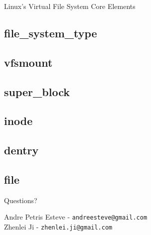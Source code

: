 \documentclass{beamer}
\begin{document}
\begin{frame}{Linux's Virtual File System Core Elements}
	

\end{frame}

\subsection{file\_system\_type}

\subsection{vfsmount}

\subsection{super\_block}

\subsection{inode}

\subsection{dentry}

\subsection{file}



\begin{frame}[plain]

  \begin{center}
    \Huge Questions?
  \end{center}

  \vspace{0.2in}

  \begin{center}
	Andre Petris Esteve - \texttt{andreesteve@gmail.com}\\
	Zhenlei Ji - \texttt{zhenlei.ji@gmail.com}
  \end{center}
\end{frame}
\end{document}
